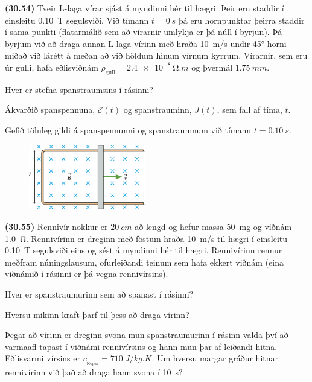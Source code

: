 \begin{enumerate}[label = \textbf{(\alph*)}]
\begin{minipage}{\linewidth}
\item[\textbf{(30.54)}] Tveir L-laga vírar sjást á myndinni hér til hægri. Þeir eru staddir í einsleitu \SI{0.10}{T} segulsviði. Við tímann $t = \SI{0}{s}$ þá eru hornpunktar þeirra staddir í sama punkti (flatarmálið sem að vírarnir umlykja er þá núll í byrjun). Þá byrjum við að draga annan L-laga vírinn með hraða \SI{10}{m/s} undir \ang{45} horni miðað við lárétt á meðan að við höldum hinum vírnum kyrrum. Vírarnir, sem eru úr gulli, hafa eðlisviðnám $\rho_{\text{gull}} = \SI{2.4e-8}{\ohm.m}$ og þvermál $\SI{1.75}{mm}$. \begin{enumerate*}[label = \textbf{(\alph*)}]
    \item Hver er stefna spanstraumsins í rásinni?
    \item Ákvarðið spanspennuna, $\mathcal{E}(t)$ og spanstrauminn, $J(t)$, sem fall af tíma, $t$.
    \item Gefið töluleg gildi á spanspennunni og spanstraumnum við tímann $t = \SI{0.10}{s}$.
\end{enumerate*}

\end{minipage}

\vspace{0.3cm}


\begin{minipage}{\linewidth}
\begin{figure}
\vspace{-0.25cm}
\includegraphics[width = 2in]{figures/rk3026b.pdf}
\end{figure}

\item[\textbf{(30.55)}]  Rennivír nokkur er $\SI{20}{cm}$ að lengd og hefur massa \SI{50}{mg} og viðnám \SI{1.0}{\ohm}. Rennivírinn er dreginn með föstum hraða \SI{10}{m/s} til hægri í einsleitu \SI{0.10}{T} segulsviði eins og sést á myndinni hér til hægri. Rennivírinn rennur meðfram núningslausum, ofurleiðandi teinum sem hafa ekkert viðnám (eina viðnámið í rásinni er þá vegna rennivírsins). \begin{enumerate*}[label = \textbf{(\alph*)}]
    \item Hver er spanstraumurinn sem að spanast í rásinni?
    \item Hversu mikinn kraft þarf til þess að draga vírinn?
    \item Þegar að vírinn er dreginn svona mun spanstraumurinn í rásinn valda því að varmaafl tapast í viðnámi rennivírsins og hann mun þar af leiðandi hitna. Eðlisvarmi vírsins er $c_{\!_\text{Kopar}} = \SI{710}{J/kg.K}$. Um hversu margar gráður hitnar rennivírinn við það að draga hann svona í \SI{10}{s}?
\end{enumerate*}


\end{minipage}
\end{enumerate}
